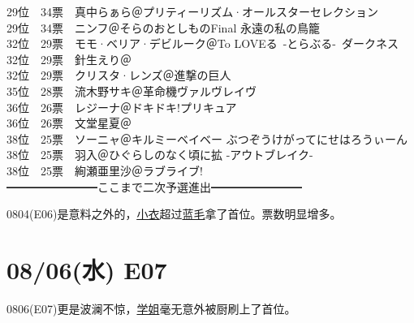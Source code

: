 { 29位　34票　真中らぁら＠プリティーリズム·オールスターセレクション\\
 29位　34票　ニンフ＠そらのおとしものFinal 永遠の私の鳥籠\\
 32位　29票　モモ·ベリア·デビルーク＠To LOVEる~-とらぶる-~ダークネス\\
 32位　29票　針生えり＠\Saki\\
 32位　29票　クリスタ·レンズ＠進撃の巨人\\
 35位　28票　流木野サキ＠革命機ヴァルヴレイヴ\\
 36位　26票　レジーナ＠ドキドキ!プリキュア\\
 36位　26票　文堂星夏＠\Saki\\
 38位　25票　ソーニャ＠キルミーベイベー ぶつぞうけがってにせはろうぃーん\\
 38位　25票　羽入＠ひぐらしのなく頃に拡 -アウトブレイク-\\
 38位　25票　絢瀬亜里沙＠ラブライブ!\\
 ━━━━━━━━ここまで二次予選進出━━━━━━━━
}

0804(E06)是意料之外的，\uline{\uline{小衣}}超过\uline{蓝毛}拿了首位。票数明显增多。

\section{08/06(水) E07}


0806(E07)更是波澜不惊，\uline{学姐}毫无意外被厨刷上了首位。


